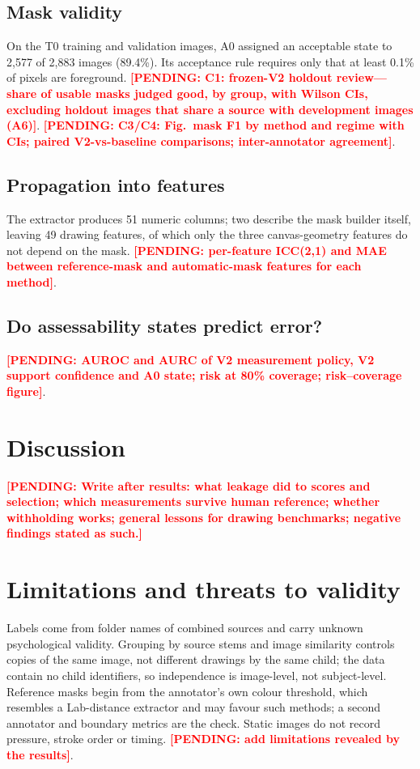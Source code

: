 \documentclass[pdflatex,sn-mathphys-num]{sn-jnl}
\newcommand{\pending}[1]{\textcolor{red}{\textbf{[PENDING: #1]}}}
\begin{document}
\subsection{Mask validity}\label{sec:res-mask}
On the T0 training and validation images, A0 assigned an acceptable state to 2,577 of 2,883 images (89.4\%). Its acceptance rule requires only that at least 0.1\% of pixels are foreground. \pending{C1: frozen-V2 holdout review---share of usable masks judged good, by group, with Wilson CIs, excluding holdout images that share a source with development images (A6)}. \pending{C3/C4: Fig.~mask F1 by method and regime with CIs; paired V2-vs-baseline comparisons; inter-annotator agreement}.

\subsection{Propagation into features}\label{sec:res-feat}
The extractor produces 51 numeric columns; two describe the mask builder itself, leaving 49 drawing features, of which only the three canvas-geometry features do not depend on the mask. \pending{per-feature ICC(2,1) and MAE between reference-mask and automatic-mask features for each method}.

\subsection{Do assessability states predict error?}\label{sec:res-gate}
\pending{AUROC and AURC of V2 measurement policy, V2 support confidence and A0 state; risk at 80\% coverage; risk--coverage figure}.

\section{Discussion}\label{sec:discussion}
\pending{Write after results: what leakage did to scores and selection; which measurements survive human reference; whether withholding works; general lessons for drawing benchmarks; negative findings stated as such.}

\section{Limitations and threats to validity}\label{sec:limits}
Labels come from folder names of combined sources and carry unknown psychological validity. Grouping by source stems and image similarity controls copies of the same image, not different drawings by the same child; the data contain no child identifiers, so independence is image-level, not subject-level. Reference masks begin from the annotator's own colour threshold, which resembles a Lab-distance extractor and may favour such methods; a second annotator and boundary metrics are the check. Static images do not record pressure, stroke order or timing. \pending{add limitations revealed by the results}.
\end{document}
